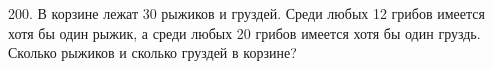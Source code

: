 200. В корзине лежат 30 рыжиков и груздей. Среди любых 12 грибов имеется хотя бы один рыжик, а среди любых 20 грибов имеется хотя бы один груздь. Сколько рыжиков и сколько груздей в корзине?\\
